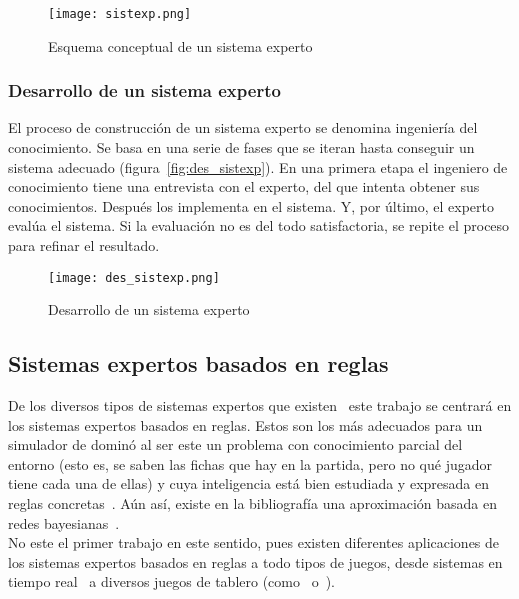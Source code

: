 \begin{figure}[h]
  \label{fig:sistexp}
  \begin{center}
    \texttt{[image: sistexp.png]}
  \end{center}
  \caption{Esquema conceptual de un sistema experto}
\end{figure}

\subsubsection{Desarrollo de un sistema experto}

El proceso de construcción de un sistema experto se denomina ingeniería del conocimiento. Se basa en una serie de fases que se iteran hasta conseguir un sistema adecuado (figura~\vref{fig:des_sistexp}). En una primera etapa el ingeniero de conocimiento tiene una entrevista con el experto, del que intenta obtener sus conocimientos. Después los implementa en el sistema. Y, por último, el experto evalúa el sistema. Si la evaluación no es del todo satisfactoria, se repite el proceso para refinar el resultado. \\

\begin{figure}[h]
  \label{fig:des_sistexp}
  \begin{center}
    \texttt{[image: des\_sistexp.png]}
  \end{center}
  \caption{Desarrollo de un sistema experto}
\end{figure}


\subsection{Sistemas expertos basados en reglas}

De los diversos tipos de sistemas expertos que existen~\cite{ShuHsienLiao200593} este trabajo se centrará en los sistemas expertos basados en reglas. Estos son los más adecuados para un simulador de dominó al ser este un problema con conocimiento parcial del entorno (esto es, se saben las fichas que hay en la partida, pero no qué jugador tiene cada una de ellas) y cuya inteligencia está bien estudiada y expresada en reglas concretas~\cite{Borrajo1990129}. Aún así, existe en la bibliografía una aproximación basada en redes bayesianas~\cite{PFCRoss}. \\

No este el primer trabajo en este sentido, pues existen diferentes aplicaciones de los sistemas expertos basados en reglas a todo tipos de juegos, desde sistemas en tiempo real~\cite{DBLP:conf/robocup/FathzadehMMS05} a diversos juegos de tablero (como~\cite{PFCRecio} o~\cite{PFCChaves}). \\

